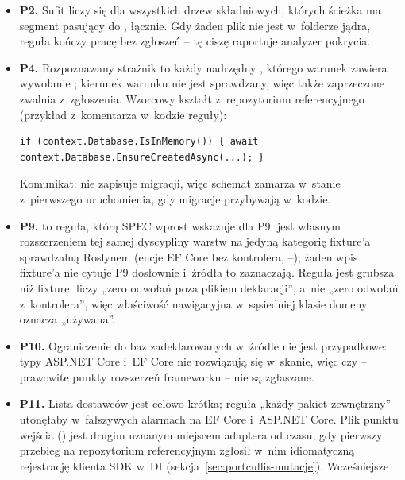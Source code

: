 \begin{itemize}[leftmargin=*]
  \item \textbf{P2.} Sufit liczy się dla wszystkich drzew składniowych, których ścieżka ma
        segment pasujący do , łącznie. Gdy żaden plik nie jest
        w~folderze jądra, reguła kończy pracę bez zgłoszeń -- tę ciszę raportuje analyzer
        pokrycia.
  \item \textbf{P4.} Rozpoznawany strażnik to każdy nadrzędny , którego warunek
        zawiera wywołanie ; kierunek warunku nie jest sprawdzany, więc
        także zaprzeczone  zwalnia z~zgłoszenia.
        Wzorcowy kształt z~repozytorium referencyjnego (przykład z~komentarza w~kodzie reguły):
\begin{lstlisting}
if (context.Database.IsInMemory()) { await context.Database.EnsureCreatedAsync(...); }
\end{lstlisting}
        Komunikat:  nie zapisuje migracji, więc schemat
        zamarza w~stanie z~pierwszego uruchomienia, gdy migracje przybywają w~kodzie.
  \item \textbf{P9.}  to reguła, którą SPEC wprost
        wskazuje dla P9.  jest własnym rozszerzeniem tej samej
        dyscypliny warstw na jedyną kategorię fixture'a sprawdzalną Roslynem (encje
        EF Core bez kontrolera, --); żaden
        wpis fixture'a nie cytuje P9 dosłownie i~źródła to zaznaczają. Reguła jest
        grubsza niż fixture: liczy „zero odwołań poza plikiem deklaracji”, a~nie „zero
        odwołań z~kontrolera”, więc właściwość nawigacyjna w~sąsiedniej klasie domeny
        oznacza „używana”.
  \item \textbf{P10.} Ograniczenie do baz zadeklarowanych w~źródle nie jest przypadkowe:
        typy ASP.NET Core i~EF Core nie rozwiązują się w~skanie, więc 
        czy  -- prawowite punkty rozszerzeń frameworku -- nie są
        zgłaszane.
  \item \textbf{P11.} Lista dostawców jest celowo krótka; reguła „każdy pakiet zewnętrzny”
        utonęłaby w~fałszywych alarmach na EF Core i~ASP.NET Core. Plik punktu wejścia
        () jest drugim uznanym miejscem adaptera od czasu, gdy
        pierwszy przebieg na repozytorium referencyjnym zgłosił w~nim idiomatyczną
        rejestrację klienta SDK w~DI (sekcja~\ref{sec:portcullis-mutacje}). Wcześniejsze

\end{itemize}
